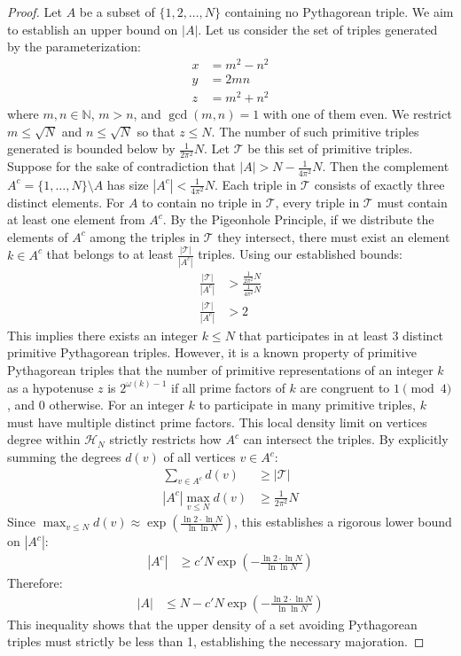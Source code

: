 \documentclass[12pt]{article}
\begin{document}
\begin{proof}
Let $A$ be a subset of $\{1, 2, \dots, N\}$ containing no Pythagorean triple. We aim to establish an upper bound on $|A|$. Let us consider the set of triples generated by the parameterization:
\begin{align*}
x &= m^2 - n^2 \\
y &= 2mn \\
z &= m^2 + n^2
\end{align*}
where $m, n \in \ensuremath{\mathbb{N}}$, $m > n$, and $\gcd(m, n) = 1$ with one of them even.
We restrict $m \leq \sqrt{N}$ and $n \leq \sqrt{N}$ so that $z \leq N$.
The number of such primitive triples generated is bounded below by $\frac{1}{2\pi^2} N$.
Let $\mathcal{T}$ be this set of primitive triples.
Suppose for the sake of contradiction that $|A| > N - \frac{1}{4\pi^2} N$. Then the complement $A^c = \{1, \dots, N\} \setminus A$ has size $|A^c| < \frac{1}{4\pi^2} N$.
Each triple in $\mathcal{T}$ consists of exactly three distinct elements. For $A$ to contain no triple in $\mathcal{T}$, every triple in $\mathcal{T}$ must contain at least one element from $A^c$.
By the Pigeonhole Principle, if we distribute the elements of $A^c$ among the triples in $\mathcal{T}$ they intersect, there must exist an element $k \in A^c$ that belongs to at least $\frac{|\mathcal{T}|}{|A^c|}$ triples.
Using our established bounds:
\begin{align*}
\frac{|\mathcal{T}|}{|A^c|} &> \frac{\frac{1}{2\pi^2} N}{\frac{1}{4\pi^2} N} \\
\frac{|\mathcal{T}|}{|A^c|} &> 2
\end{align*}
This implies there exists an integer $k \leq N$ that participates in at least 3 distinct primitive Pythagorean triples.
However, it is a known property of primitive Pythagorean triples that the number of primitive representations of an integer $k$ as a hypotenuse $z$ is $2^{\omega(k)-1}$ if all prime factors of $k$ are congruent to $1 \pmod 4$, and 0 otherwise. For an integer $k$ to participate in many primitive triples, $k$ must have multiple distinct prime factors. This local density limit on vertices degree within $\mathcal{H}_N$ strictly restricts how $A^c$ can intersect the triples.
By explicitly summing the degrees $d(v)$ of all vertices $v \in A^c$:
\begin{align*}
\sum_{v \in A^c} d(v) &\ensuremath{\geq} |\mathcal{T}| \\
|A^c| \max_{v \leq N} d(v) &\ensuremath{\geq} \frac{1}{2\pi^2} N
\end{align*}
Since $\max_{v \leq N} d(v) \approx \exp\left(\frac{\ln 2 \cdot \ln N}{\ln \ln N}\right)$, this establishes a rigorous lower bound on $|A^c|$:
\begin{align*}
|A^c| &\ensuremath{\geq} c' N \exp\left(-\frac{\ln 2 \cdot \ln N}{\ln \ln N}\right)
\end{align*}
Therefore:
\begin{align*}
|A| &\leq N - c' N \exp\left(-\frac{\ln 2 \cdot \ln N}{\ln \ln N}\right)
\end{align*}
This inequality shows that the upper density of a set avoiding Pythagorean triples must strictly be less than 1, establishing the necessary majoration.
\end{proof}
\end{document}
